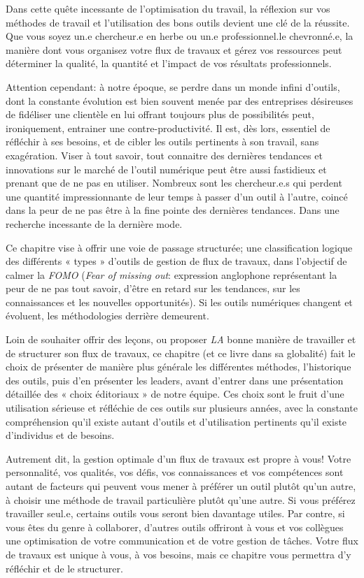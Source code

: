 \documentclass[
  letterpaper,
  DIV=11,
  numbers=noendperiod]{scrreprt}
\begin{document}
Dans cette quête incessante de l'optimisation du travail, la réflexion
sur vos méthodes de travail et l'utilisation des bons outils devient une
clé de la réussite. Que vous soyez un.e chercheur.e en herbe ou un.e
professionnel.le chevronné.e, la manière dont vous organisez votre flux
de travaux et gérez vos ressources peut déterminer la qualité, la
quantité et l'impact de vos résultats professionnels.

Attention cependant: à notre époque, se perdre dans un monde infini
d'outils, dont la constante évolution est bien souvent menée par des
entreprises désireuses de fidéliser une clientèle en lui offrant
toujours plus de possibilités peut, ironiquement, entrainer une
contre-productivité. Il est, dès lors, essentiel de réfléchir à ses
besoins, et de cibler les outils pertinents à son travail, sans
exagération. Viser à tout savoir, tout connaitre des dernières tendances
et innovations sur le marché de l'outil numérique peut être aussi
fastidieux et prenant que de ne pas en utiliser. Nombreux sont les
chercheur.e.s qui perdent une quantité impressionnante de leur temps à
passer d'un outil à l'autre, coincé dans la peur de ne pas être à la
fine pointe des dernières tendances. Dans une recherche incessante de la
dernière mode.

Ce chapitre vise à offrir une voie de passage structurée; une
classification logique des différents « types » d'outils de gestion de
flux de travaux, dans l'objectif de calmer la \emph{FOMO} (\emph{Fear of
missing out}: expression anglophone représentant la peur de ne pas tout
savoir, d'être en retard sur les tendances, sur les connaissances et les
nouvelles opportunités). Si les outils numériques changent et évoluent,
les méthodologies derrière demeurent.

Loin de souhaiter offrir des leçons, ou proposer \emph{LA} bonne manière
de travailler et de structurer son flux de travaux, ce chapitre (et ce
livre dans sa globalité) fait le choix de présenter de manière plus
générale les différentes méthodes, l'historique des outils, puis d'en
présenter les leaders, avant d'entrer dans une présentation détaillée
des « choix éditoriaux » de notre équipe. Ces choix sont le fruit d'une
utilisation sérieuse et réfléchie de ces outils sur plusieurs années,
avec la constante compréhension qu'il existe autant d'outils et
d'utilisation pertinents qu'il existe d'individus et de besoins.

Autrement dit, la gestion optimale d'un flux de travaux est propre à
vous! Votre personnalité, vos qualités, vos défis, vos connaissances et
vos compétences sont autant de facteurs qui peuvent vous mener à
préférer un outil plutôt qu'un autre, à choisir une méthode de travail
particulière plutôt qu'une autre. Si vous préférez travailler seul.e,
certains outils vous seront bien davantage utiles. Par contre, si vous
êtes du genre à collaborer, d'autres outils offriront à vous et vos
collègues une optimisation de votre communication et de votre gestion de
tâches. Votre flux de travaux est unique à vous, à vos besoins, mais ce
chapitre vous permettra d'y réfléchir et de le structurer.
\end{document}
